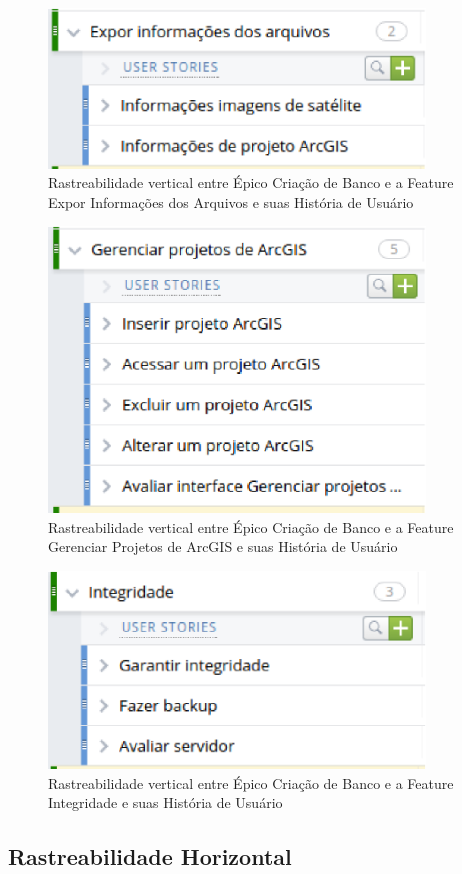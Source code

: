   \begin{figure}[!htb]
    \centering
    \includegraphics[width=10cm, keepaspectratio=false]{figuras/rastreabilidade/vertical/feature_expor.eps}
    \caption{Rastreabilidade vertical entre Épico Criação de Banco e a Feature Expor Informações dos Arquivos e suas História de Usuário}
  \end{figure}

  \begin{figure}[!htb]
    \centering
    \includegraphics[width=10cm, keepaspectratio=false]{figuras/rastreabilidade/vertical/feature_gerenciar_projeto.eps}
    \caption{Rastreabilidade vertical entre Épico Criação de Banco e a Feature Gerenciar Projetos de ArcGIS e suas História de Usuário}
  \end{figure}

  \begin{figure}[!htb]
    \centering
    \includegraphics[width=10cm, keepaspectratio=false]{figuras/rastreabilidade/vertical/feature_integridade.eps}
    \caption{Rastreabilidade vertical entre Épico Criação de Banco e a Feature Integridade e suas História de Usuário}
  \end{figure}




\subsection{Rastreabilidade Horizontal}

